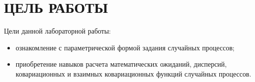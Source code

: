 \section{ЦЕЛЬ РАБОТЫ}

Цели данной лабораторной работы:

\begin{itemize}
\item
  ознакомление с параметрической формой задания случайных процессов;
\item
  приобретение навыков расчета математических ожиданий, дисперсий, 
  ковариационных и взаимных ковариационных функций случайных процессов.
\end{itemize}
